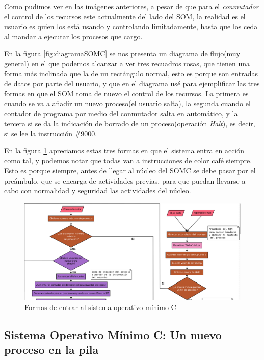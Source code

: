 \documentclass[letterpaper,12pt,oneside]{book}
\begin{document}
		Como pudimos ver en las imágenes anteriores, a pesar de que para el \textit{conmutador} el control de los recursos este actualmente del lado
		del SOM, la realidad es el usuario es quien los está usando y controlando limitadamente, hasta que los ceda al mandar a ejecutar los procesos que cargo. 
  
        En la figura \ref{fig:diagramaSOMC} se nos presenta un diagrama de flujo(muy general) en el que podemos alcanzar a ver tres recuadros
		rosas, que tienen una forma más inclinada que la de un rectángulo normal, esto es porque son entradas de datos por parte del usuario, y
		que en el diagrama usé para ejemplificar las tres formas en que el SOM toma de nuevo el control de los recursos. La primera es cuando
		se va a añadir un nuevo proceso(el usuario salta), la segunda cuando el contador de programa por medio del conmutador salta en automático, y la tercera
		si se da la indicación de borrado de un proceso(operación \textit{Halt}), es decir, si se lee la instrucción \#9000.
		
		
		En la figura \ref{fig:eccSOMCdiagent} apreciamos estas tres formas en que el sistema entra en acción como tal, y podemos notar que todas van a instrucciones
		de color café siempre. Esto es porque siempre, antes de llegar al núcleo del SOMC se debe pasar por el preámbulo, que se encarga de actividades previas,
		para que puedan llevarse a cabo con normalidad y seguridad las actividades del núcleo.
		
		
		\begin{figure}[h]		
			\centering
			\includegraphics[scale=0.25]{media/CARDIACC/ecardiaccDiagrama_entradas.png}
			\caption{Formas de entrar al sistema operativo mínimo C}
			\label{fig:eccSOMCdiagent}
		\end{figure}
		

        \subsection{Sistema Operativo Mínimo C: Un nuevo proceso en la pila}
        
\end{document}
